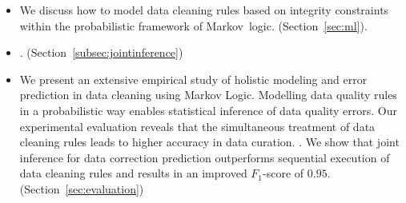 \begin{itemize}

  \item We discuss how to model data cleaning rules based on integrity constraints within the probabilistic framework of Markov~logic. (Section~\ref{sec:ml}).

  \item {}. (Section~\ref{subsec:jointinference})

	\item We present an extensive empirical study of holistic modeling and error prediction in data cleaning using Markov Logic. Modelling data quality rules in a probabilistic way enables statistical inference of data quality errors. Our experimental evaluation reveals that the simultaneous treatment of data cleaning rules leads to higher accuracy in data curation. . We show that joint inference for data correction prediction outperforms sequential execution of data cleaning rules and results in an improved $F_1$-score of $0.95$. (Section~\ref{sec:evaluation})
	
 
	
  
\end{itemize}


